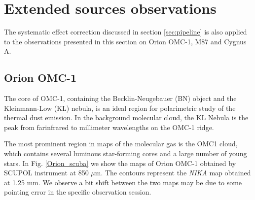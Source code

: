\documentclass[twocolumn,traditabstract]{aa}
\begin{document}
	   
\section{Extended sources observations}\label{extended results}
The systematic effect correction discussed in section \ref{sec:pipeline} is also applied to the observations presented in this section on Orion OMC-1, M87 and Cygnus A. 

\subsection{Orion OMC-1}
The core of OMC-1, containing the Becklin-Neugebauer (BN) object and the Kleinmann-Low (KL) nebula, is an ideal region for polarimetric study of the thermal dust emission. In the background molecular cloud, the KL Nebula is the  peak from farinfrared to millimeter wavelengths on the OMC-1 ridge.

The most prominent region in maps of the molecular gas is the OMC1 cloud, which contains several luminous star-forming cores \cite{chini1997} and a large number of young stars. 
In Fig. \ref{Orion_scuba} we show the maps of Orion OMC-1 obtained by SCUPOL instrument \citep{scubapol} at 850 $\mu$m. The contours represent the {\it NIKA} map obtained at 1.25 mm. We observe a bit shift between the two maps may be due to some pointing error in the specific observation session. 
\end{document}
